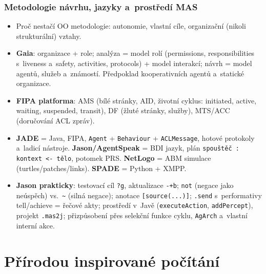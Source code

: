 \documentclass[11pt,a4paper]{article}
\theoremstyle{definition}
\begin{document}
\section{Metodologie návrhu, jazyky a~prostředí MAS}
\begin{itemize}
\item Proč nestačí OO metodologie: autonomie, vlastní cíle, organizační (nikoli strukturální)
 vztahy.
\item \textbf{Gaia}: organizace + role; analýza = model rolí (permissions, responsibilities
 s~liveness a~safety, activities, protocols) + model interakcí; návrh = model agentů,
 služeb a~známostí. Předpoklad kooperativních agentů a~statické organizace.
\item \textbf{FIPA platforma}: AMS (bílé stránky, AID, životní cyklus: initiated, active,
 waiting, suspended, transit), DF (žluté stránky, služby), MTS/ACC (doručování ACL zpráv).
\item \textbf{JADE} = Java, FIPA, \texttt{Agent} + \texttt{Behaviour} + \texttt{ACLMessage},
 hotové protokoly a~ladicí nástroje. \textbf{Jason/AgentSpeak} = BDI jazyk,
 plán \texttt{spouštěč : kontext <- tělo}, potomek PRS. \textbf{NetLogo} = ABM simulace
 (turtles/patches/links). \textbf{SPADE} = Python + XMPP.
\item \textbf{Jason prakticky}: testovací cíl \texttt{?g}, aktualizace \texttt{-+b};
 \texttt{not} (negace jako neúspěch) vs.\ \texttt{\textasciitilde} (silná negace); anotace
 \texttt{[source(...)]}; \texttt{.send} s~performativy tell/achieve = řečové akty; prostředí
 v~Javě (\texttt{executeAction}, \texttt{addPercept}), projekt \texttt{.mas2j}; přizpůsobení
 přes selekční funkce cyklu, \texttt{AgArch} a~vlastní interní akce.
\end{itemize}

\part{Přírodou inspirované počítání}
\setcounter{section}{0}
\end{document}
